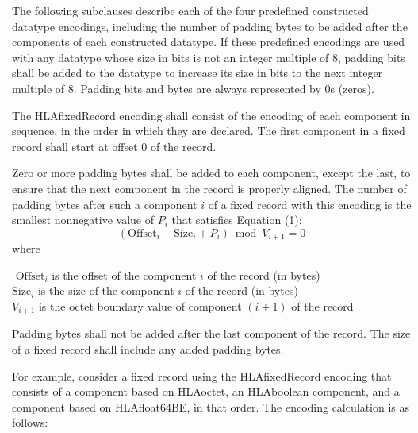 The following subclauses describe each of the four predefined constructed datatype encodings, including the number of padding bytes to be added after the components of each constructed datatype. If these predefined encodings are used with any datatype whose size in bits is not an integer multiple of 8, padding bits shall be added to the datatype to increase its size in bits to the next integer multiple of 8. Padding bits and bytes are always represented by 0s (zeros).

\par{}\par\vspace{1pt}
The HLAfixedRecord encoding shall consist of the encoding of each component in sequence, in the order in which they are declared. The first component in a fixed record shall start at offset 0 of the record.

Zero or more padding bytes shall be added to each component, except the last, to ensure that the next component in the record is properly aligned. The number of padding bytes after such a component $i$ of a fixed record with this encoding is the smallest nonnegative value of $P_i$ that satisfies Equation (1):
\begin{equation}
    (\mathrm{Offset}_i + \mathrm{Size}_i + P_i) \bmod V_{i+1} = 0
\end{equation}
where

\newpage
\begin{tabbing}
    \hspace{42pt}\=\kill
    $\mathrm{Offset}_i$ \> is the offset of the component $i$ of the record (in bytes)\\
    $\mathrm{Size}_i$ \> is the size of the component $i$ of the record (in bytes)\\
    $V_{i+1}$ \> is the octet boundary value of component $(i+1)$ of the record
\end{tabbing}

Padding bytes shall not be added after the last component of the record. The size of a fixed record shall include any added padding bytes.

For example, consider a fixed record using the HLAfixedRecord encoding that consists of a component based on HLAoctet, an HLAboolean component, and a component based on HLAfloat64BE, in that order. The encoding calculation is as follows:

